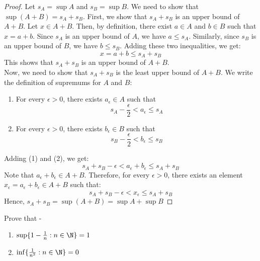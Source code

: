 \documentclass[openany]{book}
\begin{document}
\begin{proof}
Let $s_A = \sup A$ and $s_B = \sup B$. We need to show that $\sup (A + B) = s_A + s_B$. First, we show that $s_A + s_B$ is an upper bound of $A + B$. Let $x \in A + B$. Then, by definition, there exist $a \in A$ and $b \in B$ such that $x = a + b$. Since $s_A$ is an upper bound of $A$, we have $a \leq s_A$. Similarly, since $s_B$ is an upper bound of $B$, we have $b \leq s_B$. Adding these two inequalities, we get:
$$x = a + b \leq s_A + s_B$$
This shows that $s_A + s_B$ is an upper bound of $A + B$. \\
Now, we need to show that $s_A + s_B$ is the least upper bound of $A + B$. We write the definition of supremums for $A$ and $B$:
\begin{enumerate}
    \item For every $\epsilon > 0$, there exists $a_\epsilon \in A$ such that 
    \begin{equation}
    s_A - \frac{\epsilon}{2} < a_\epsilon \leq s_A
    \end{equation}
    \item For every $\epsilon > 0$, there exists $b_\epsilon \in B$ such that 
    \begin{equation}
    s_B - \frac{\epsilon}{2} < b_\epsilon \leq s_B
    \end{equation}
\end{enumerate}
Adding (1) and (2), we get:
$$s_A + s_B - \epsilon < a_\epsilon + b_\epsilon \leq s_A + s_B$$
Note that $a_\epsilon + b_\epsilon \in A + B$. Therefore, for every $\epsilon > 0$, there exists an element $x_\epsilon = a_\epsilon + b_\epsilon \in A + B$ such that:
$$s_A + s_B - \epsilon < x_\epsilon \leq s_A + s_B$$
Hence, $s_A + s_B = \sup(A + B) = \sup A + \sup B$
\end{proof}
\begin{exercise}
    Prove that - 
    \begin{enumerate}
        \item $\sup \{1 - \frac{1}{n} : n \in \N\} = 1$
        \item $\inf \{\frac{1}{n^2} : n \in \N\} = 0$
    \end{enumerate}
\end{exercise}
\end{document}
